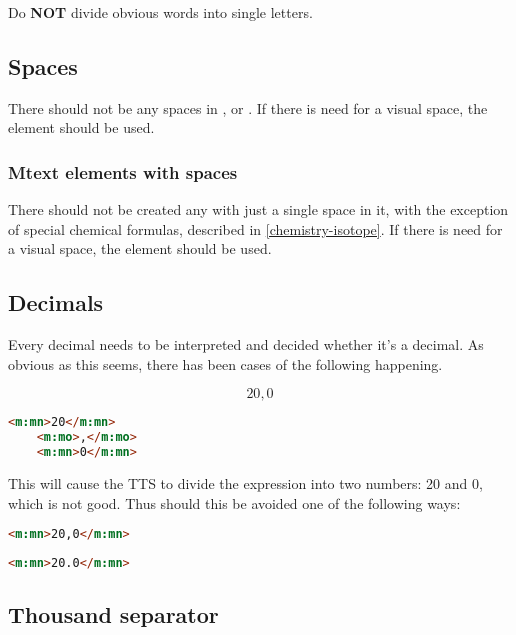 \documentclass[english,a4paper,11pt]{article}
\begin{document}
Do \textbf{NOT} divide obvious words into single letters.

\subsection{Spaces}

There should not be any spaces in ,  or . If there is need for a visual space, the element  should be used.

\subsubsection{Mtext elements with spaces}

There should not be created any  with just a single space in it, with the exception of special chemical formulas, described in \ref{chemistry-isotope}. If there is need for a visual space, the element  should be used.

\subsection{Decimals}

Every decimal needs to be interpreted and decided whether it's a decimal. As obvious as this seems, there has been cases of the following happening.

\begin{eksempler}
\begin{equation}
	20,0
\end{equation}
\begin{lstlisting}[language=HTML, caption={\textbf{Invalid markup}}]
	<m:mn>20</m:mn>
	<m:mo>,</m:mo>
	<m:mn>0</m:mn>
\end{lstlisting}

This will cause the TTS to divide the expression into two numbers: 20 and 0, which is not good. Thus should this be avoided one of the following ways:
\begin{lstlisting}[language=HTML, caption={Valid markup 1}]
	<m:mn>20,0</m:mn>
\end{lstlisting}
\begin{lstlisting}[language=HTML, caption={Valid markup 2}]
	<m:mn>20.0</m:mn>
\end{lstlisting}
\end{eksempler}

\subsection{Thousand separator}
\end{document}
